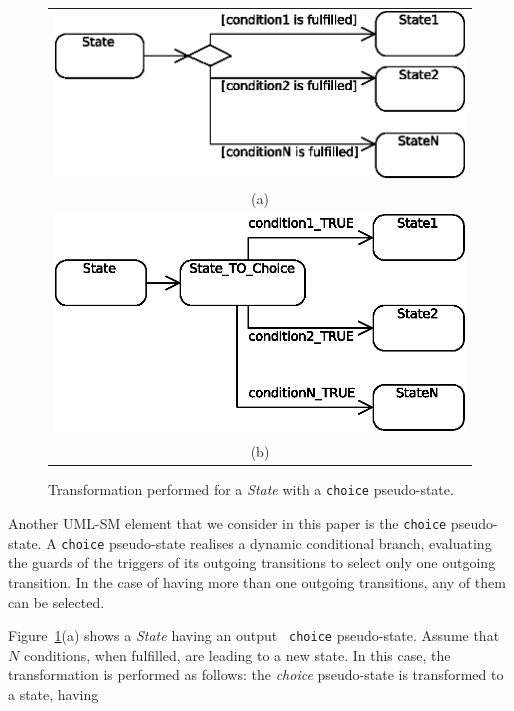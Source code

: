 \begin{figure}
  \centering
  \begin{tabular}{c}
  \includegraphics[width=0.7\columnwidth]{images/choiceBEFORE}\\ 
(a)\\
  \includegraphics[width=0.7\columnwidth]{images/choiceAFTER}\\
(b)
  \end{tabular}
  \caption{Transformation performed for a {\em State} with a {\tt choice} 
pseudo-state.}
  \label{fig:choicePseudostate}
\end{figure}

Another UML-SM element that we consider in this paper is the {\tt choice}
pseudo-state. A {\tt choice} pseudo-state realises a dynamic conditional
branch, evaluating the guards of the triggers of its outgoing transitions to
select only one outgoing transition. In the case of having more than one
outgoing transitions, any of them can be selected.

Figure~\ref{fig:choicePseudostate}(a) shows a {\em State} having an output {\tt
choice} pseudo-state. Assume that $N$ conditions, when fulfilled, are leading to
a new state. In this case, the transformation is
performed as follows: the {\em choice} pseudo-state is transformed to a state,
having

